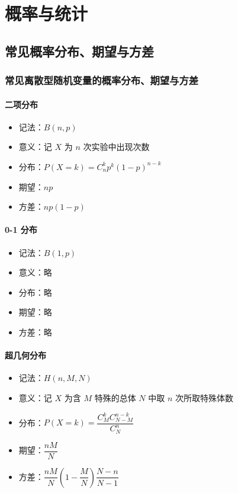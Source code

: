\chapter{概率与统计}

\section{常见概率分布、期望与方差}

\subsection{常见离散型随机变量的概率分布、期望与方差}

\subsubsection{二项分布}

\begin{itemize}
  \item 记法：$B(n, p)$
  \item 意义：记 $X$ 为 $n$ 次实验中出现次数
  \item 分布：$P(X = k) = C_n^k p^k (1-p)^{n - k}$
  \item 期望：$np$
  \item 方差：$np(1 - p)$
\end{itemize}

\subsubsection{0-1 分布}

\begin{itemize}
  \item 记法：$B(1, p)$
  \item 意义：略
  \item 分布：略
  \item 期望：略
  \item 方差：略
\end{itemize}

\subsubsection{超几何分布}

\begin{itemize}
  \item 记法：$H(n, M, N)$
  \item 意义：记 $X$ 为含 $M$ 特殊的总体 $N$ 中取 $n$ 次所取特殊体数
  \item 分布：$P(X = k) = \dfrac{C_M^k C_{N - M}^{n - k}}{C_N^n}$
  \item 期望：$\dfrac{nM}{N}$
  \item 方差：$\dfrac{nM}{N} \left( 1 - \dfrac{M}{N} \right) \dfrac{N - n}{N - 1}$
\end{itemize}

